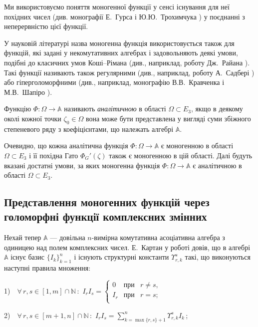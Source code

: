 \documentclass[11pt, reqno]{amsart}
\begin{document}
Ми використовуємо поняття моногенної функції у сенсі існування для
неї похідних чисел (див. монографії Е.~Гурса \cite{Goursat} і Ю.Ю.~Трохимчука \cite{Trokhimchuk}) у поєднанні з
неперервністю цієї функції.

У науковій літературі назва моногенна функція
вико\-ри\-сто\-ву\-єть\-ся також для функцій, які задані у
некомутативних алгебрах і задовольняють деякі умови, подібні до
класичних умов Коші--Рімана (див., наприклад, роботу Дж.~Райана \cite{Ryan}). Такі
функції називають також регулярними (див., наприклад, роботу А.~Садбері
\cite{Sudbery}) або гіперголоморфними (див., наприклад, монографію В.В.~Кравченка і М.В.~Шапіро
\cite{Krav-Shap}).


Функцію $\Phi : \Omega\rightarrow \mathbb A$ називають {\it
аналітичною\/} в області $\Omega\subset E_3$, якщо в деякому околі
кожної точки $\zeta_0\in \Omega$ вона може бути представлена у
вигляді суми збіжного степеневого ряду з коефіцієнтами, що
належать алгебрі $\mathbb A$.


Очевидно, що кожна аналітична функція $\Phi : \Omega\rightarrow \mathbb A$ є моногенною
в області $\Omega\subset E_3$ і її похідна Гато $\Phi_G'(\zeta)$ також є моногенною в цій області.
Далі будуть вказані достатні умови, за яких моногенна функція $\Phi : \Omega\rightarrow \mathbb A$ є аналітичною в
області $\Omega\subset E_3$.




\subsection{Представлення моногенних функцій через голоморфні функції комплексних змінних}

Нехай тепер $\mathbb{A}$ --- довільна $n$-вимірна комутативна
асоціативна алгебра з одиницею над полем комплексних чисел.
Е.~Картан у роботі \cite{Cartan} довів, що в алгебрі $\mathbb{A}$
існує базис $\{I_k\}_{k=1}^{n}$ і існують структурні константи
$\Upsilon_{r,k}^{s}$ такі, що виконуються наступні правила множення:

1)  \,\,  $\forall\, r,s\in[1,m]\cap\mathbb{N}\,:$ \quad
$I_rI_s=\left\{
\begin{array}{rcl}
0 &\mbox{при} & r\neq s, \\[1mm]
I_r &\mbox{при} & r=s;\\
\end{array}
\right.$

2) \,\,  $\forall\, r,s\in[m+1,n]\cap\mathbb{N}\,:$ \quad $I_rI_s=
\sum\limits_{k=\max\{r,s\}+1}^n \Upsilon_{r,k}^{s}I_k$\,; \vskip 1mm
\end{document}
